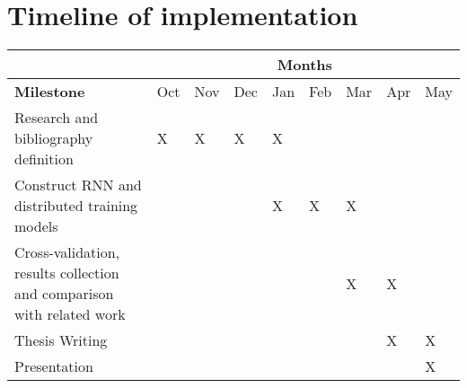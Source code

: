 \documentclass{article}
\begin{document}
    \section*{Timeline of implementation}
    \begin{center}
        \begin{tabular}{|p{3.5cm}|p{0.5cm}|p{0.5cm}|p{0.5cm}|p{0.5cm}|p{0.5cm}|p{0.5cm}|p{0.5cm}|p{0.5cm}|}
            \hline
            \cellcolor{gray} & \multicolumn{8}{c|}{Months} \\
            \hline
            \textbf{Milestone} & Oct & Nov & Dec & Jan & Feb & Mar & Apr & May \\
            \hline
            Research and bibliography definition & X & X & X & X & & & &   \\
            \hline
            Construct RNN and distributed training models & & & & X & X & X & &   \\
            \hline
            Cross-validation, results collection and comparison with related work & & & & & & X & X &   \\
            \hline
            Thesis Writing & & & & & & & X & X  \\
            \hline
            Presentation & & & & & & & & X \\
            \hline
        \end{tabular}
    \end{center}

    \section*{}~\nocite{*}
    \printbibliography
\end{document}

